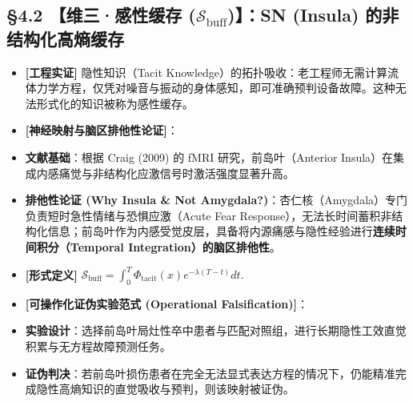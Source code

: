 \documentclass[11pt,a4paper,oneside]{ctexart}
\begin{document}
\subsection{§4.2 【维三·感性缓存 (\texorpdfstring{$\mathcal{S}_{\text{buff}}$}{S\_buff})】：SN (Insula) 的非结构化高熵缓存}

\begin{itemize}\item \textbf{[工程实证]} 隐性知识（Tacit Knowledge）的拓扑吸收：老工程师无需计算流体力学方程，仅凭对噪音与振动的身体感知，即可准确预判设备故障。这种无法形式化的知识被称为感性缓存。\end{itemize}
\begin{itemize}\item \textbf{[神经映射与脑区排他性论证]}：\end{itemize}
\begin{itemize}\item \textbf{文献基础}：根据 Craig (2009) 的 fMRI 研究，前岛叶（Anterior Insula）在集成内感痛觉与非结构化应激信号时激活强度显著升高。\end{itemize}
\begin{itemize}\item \textbf{排他性论证 (Why Insula \& Not Amygdala?)}：杏仁核（Amygdala）专门负责短时急性情绪与恐惧应激（Acute Fear Response），无法长时间蓄积非结构化信息；前岛叶作为内感受觉皮层，具备将内源痛感与隐性经验进行\textbf{连续时间积分（Temporal Integration）的脑区排他性}。\end{itemize}
\begin{itemize}\item \textbf{[形式定义]} $\mathcal{S}_{\text{buff}} = \int_{0}^{T} \Phi_{\text{tacit}}(x) e^{-\lambda (T-t)} dt.$\end{itemize}
\begin{itemize}\item \textbf{[可操作化证伪实验范式 (Operational Falsification)]}：\end{itemize}
\begin{itemize}\item \textbf{实验设计}：选择前岛叶局灶性卒中患者与匹配对照组，进行长期隐性工效直觉积累与无方程故障预测任务。\end{itemize}
\begin{itemize}\item \textbf{证伪判决}：若前岛叶损伤患者在完全无法显式表达方程的情况下，仍能精准完成隐性高熵知识的直觉吸收与预判，则该映射被证伪。\end{itemize}
\end{document}
